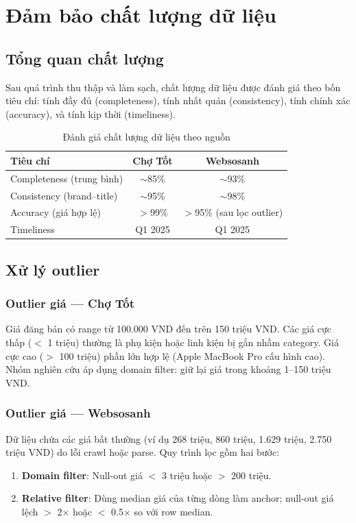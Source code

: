 \section{Đảm bảo chất lượng dữ liệu}
\label{sec:data-quality}

\subsection{Tổng quan chất lượng}

Sau quá trình thu thập và làm sạch, chất lượng dữ liệu được đánh giá theo bốn tiêu chí: tính đầy đủ (completeness), tính nhất quán (consistency), tính chính xác (accuracy), và tính kịp thời (timeliness).

\begin{table}[H]
    \centering
    \caption{Đánh giá chất lượng dữ liệu theo nguồn}
    \label{tab:data-quality}
    \begin{tabular}{lcc}
        \toprule
        \textbf{Tiêu chí} & \textbf{Chợ Tốt} & \textbf{Websosanh} \\
        \midrule
        Completeness (trung bình) & $\sim$85\% & $\sim$93\% \\
        Consistency (brand--title) & $\sim$95\% & $\sim$98\% \\
        Accuracy (giá hợp lệ) & $>$99\% & $>$95\% (sau lọc outlier) \\
        Timeliness & Q1 2025 & Q1 2025 \\
        \bottomrule
    \end{tabular}
\end{table}

\subsection{Xử lý outlier}

\subsubsection{Outlier giá --- Chợ Tốt}
Giá đăng bán có range từ 100.000 VND đến trên 150 triệu VND. Các giá cực thấp ($<$ 1 triệu) thường là phụ kiện hoặc linh kiện bị gắn nhầm category. Giá cực cao ($>$ 100 triệu) phần lớn hợp lệ (Apple MacBook Pro cấu hình cao). Nhóm nghiên cứu áp dụng domain filter: giữ lại giá trong khoảng 1--150 triệu VND.

\subsubsection{Outlier giá --- Websosanh}
Dữ liệu chứa các giá bất thường (ví dụ 268 triệu, 860 triệu, 1.629 triệu, 2.750 triệu VND) do lỗi crawl hoặc parse. Quy trình lọc gồm hai bước:
\begin{enumerate}[noitemsep]
    \item \textbf{Domain filter}: Null-out giá $<$ 3 triệu hoặc $>$ 200 triệu.
    \item \textbf{Relative filter}: Dùng median giá của từng dòng làm anchor; null-out giá lệch $>$ 2$\times$ hoặc $<$ 0.5$\times$ so với row median.
\end{enumerate}

